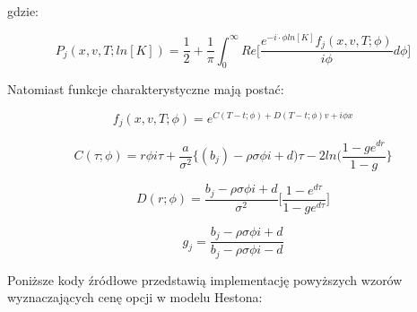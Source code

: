 \documentclass{pracamgr}
\begin{document}
gdzie:


\begin{equation}
  P_j (x, v, T; ln[K]) = \frac{1}{2} + \frac{1}{\pi} \int_{0}^{\infty} Re \bigg[ \frac{e^{-i \cdot \phi ln[K]} f_j(x, v, T; \phi) }{i \phi} d \phi \bigg]
\end{equation}

Natomiast funkcje charakterystyczne mają postać: 

\begin{equation}
   f_j(x, v, T; \phi) = e^{C(T-t; \phi) + D(T-t; \phi)v + i \phi x}
\end{equation}

\begin{equation}
  C (\tau; \phi) = r \phi i \tau + \frac{a}{\sigma^2} \bigg\{ (b_j) - \rho \sigma \phi i + d) \tau - 2 ln (\frac{1 - ge^{dr}}{1-g} \bigg\}
\end{equation}

\begin{equation}
D (r; \phi)  = \frac{b_j- \rho \sigma \phi i + d}{\sigma^2} \bigg[ \frac{1 - e^{d\tau}}{1 - ge^{d\tau}} \bigg]  
\end{equation}

\begin{equation}
g_j= \frac{b_j - \rho \sigma \phi i + d}{b_j - \rho \sigma \phi i - d}
\end{equation}

Poniższe kody źródłowe przedstawią implementację powyższych wzorów wyznaczających cenę opcji w modelu Hestona:




\end{document}
